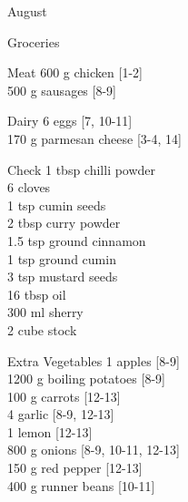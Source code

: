 \begin{menu}{August}
\begin{shoppinglist}{Groceries}
      \end{shoppinglist}%
      \par\vfil %
      \begin{shoppinglist}{Meat}
      600 g chicken {\scriptsize[1-2]}\\
      500 g sausages {\scriptsize[8-9]}\\
      \end{shoppinglist}%
      \begin{shoppinglist}{Dairy}
      6  eggs {\scriptsize[7, 10-11]}\\
      170 g parmesan cheese {\scriptsize[3-4, 14]}\\
      \end{shoppinglist}%
      \par\vfil %
      \vfil\clearpage %
      \begin{shoppinglist}{Check}
      1 tbsp chilli powder \\
      6  cloves \\
      1 tsp cumin seeds \\
      2 tbsp curry powder \\
      1.5 tsp ground cinnamon \\
      1 tsp ground cumin \\
      3 tsp mustard seeds \\
      16 tbsp oil \\
      300 ml sherry \\
      2 cube stock \\
      \end{shoppinglist}%
      \begin{shoppinglist}{Extra Vegetables}
      1  apples {\scriptsize[8-9]}\\
      1200 g boiling potatoes {\scriptsize[8-9]}\\
      100 g carrots {\scriptsize[12-13]}\\
      4  garlic {\scriptsize[8-9, 12-13]}\\
      1  lemon {\scriptsize[12-13]}\\
      800 g onions {\scriptsize[8-9, 10-11, 12-13]}\\
      150 g red pepper {\scriptsize[12-13]}\\
      400 g runner beans {\scriptsize[10-11]}\\
      \end{shoppinglist}%
      \par\vfil %
    \vfil\clearpage
  

\end{menu}
